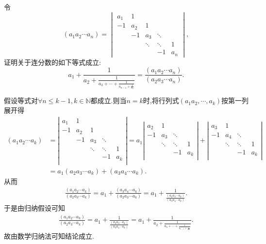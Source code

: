 \documentclass[../../main.tex]{subfiles}
\begin{document}
\begin{example}
令
\[
\left( a_{1} a_{2} \cdots a_{n} \right) = 
\begin{vmatrix}
a_{1} & 1 &   &   &   \\
-1 & a_{2} & 1 &   &   \\
& -1 & a_{3} & \ddots &   \\
&   & \ddots & \ddots & 1 \\
&   &   & -1 & a_{n}
\end{vmatrix},
\]
证明关于连分数的如下等式成立:
\[
a_{1} + \frac{1}{a_{2} + \frac{1}{a_{3} + \cdots + \frac{1}{a_{n - 1} + \frac{1}{a_{n}}}}} = \frac{\left( a_{1} a_{2} \cdots a_{n} \right)}{\left( a_{2} a_{3} \cdots a_{n} \right)}.
\]
\end{example}
\begin{solution}
假设等式对$\forall n\leqslant  k-1,k\in \mathbb{N}$都成立.则当$n=k$时,将行列式$(a_1a_2,\cdots,a_k)$按第一列展开得
\begin{align*}
\left( a_1a_2\cdots a_k \right) &=\left| \begin{matrix}
a_1&		1&		&		&		\\
-1&		a_2&		1&		&		\\
&		-1&		a_3&		\ddots&		\\
&		&		\ddots&		\ddots&		1\\
&		&		&		-1&		a_k\\
\end{matrix} \right|=a_1\left| \begin{matrix}
a_2&		1&		&		\\
-1&		a_3&		\ddots&		\\
&		\ddots&		\ddots&		1\\
&		&		-1&		a_k\\
\end{matrix} \right|+\left| \begin{matrix}
a_3&		1&		&		\\
-1&		a_4&		\ddots&		\\
&		\ddots&		\ddots&		1\\
&		&		-1&		a_k\\
\end{matrix} \right|
\\
&=a_1\left( a_2a_3\cdots a_k \right) +\left( a_3a_4\cdots a_k \right).
\end{align*}
从而
\begin{align*}
\frac{\left( a_1a_2\cdots a_k \right)}{\left( a_2a_3\cdots a_k \right)}=a_1+\frac{\left( a_3a_4\cdots a_k \right)}{\left( a_2a_3\cdots a_k \right)}=a_1+\frac{1}{\frac{\left( a_2a_3\cdots a_k \right)}{\left( a_3a_4\cdots a_k \right)}}.
\end{align*}
于是由归纳假设可知
\begin{align*}
\frac{\left( a_1a_2\cdots a_k \right)}{\left( a_2a_3\cdots a_k \right)}=a_1+\frac{1}{\frac{\left( a_2a_3\cdots a_k \right)}{\left( a_3a_4\cdots a_k \right)}}=a_1+\frac{1}{a_2+\frac{1}{a_3+\cdots +\frac{1}{a_{n-1}+\frac{1}{a_n}}}}.
\end{align*}
故由数学归纳法可知结论成立.

\end{solution}
\end{document}
